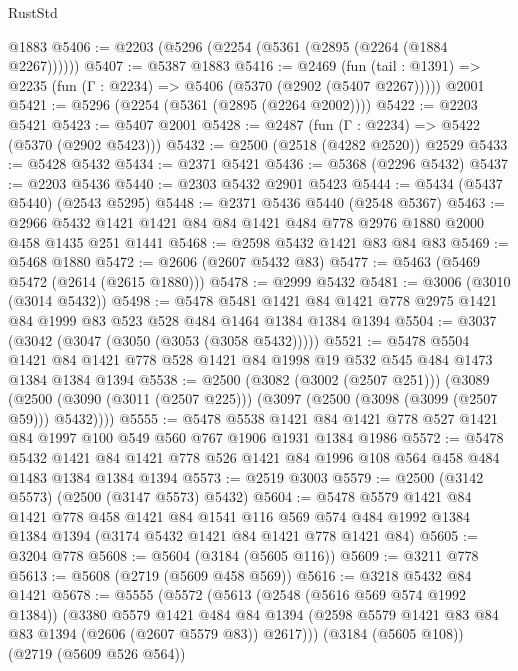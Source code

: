 \begin{lexlean}{RustStd}
\begin{coremodule}
    @1883
@5406 := @2203 (@5296 (@2254 (@5361 (@2895 (@2264 (@1884 @2267))))))
@5407 := @5387 @1883
@5416 := @2469
    (fun (tail : @1391) => @2235 (fun (Γ : @2234) => @5406 (@5370 (@2902 (@5407 @2267)))))
    @2001
@5421 := @5296 (@2254 (@5361 (@2895 (@2264 @2002))))
@5422 := @2203 @5421
@5423 := @5407 @2001
@5428 := @2487 (fun (Γ : @2234) => @5422 (@5370 (@2902 @5423)))
@5432 := @2500 (@2518 (@4282 @2520)) @2529
@5433 := @5428 @5432
@5434 := @2371 @5421
@5436 := @5368 (@2296 @5432)
@5437 := @2203 @5436
@5440 := @2303 @5432 @2901 @5423
@5444 := @5434 (@5437 @5440) (@2543 @5295)
@5448 := @2371 @5436 @5440 (@2548 @5367)
@5463 := @2966 @5432 @1421 @1421 @84 @84 @1421 @484 @778 @2976 @1880 @2000 @458 @1435 @251 @1441
@5468 := @2598 @5432 @1421 @83 @84 @83
@5469 := @5468 @1880
@5472 := @2606 (@2607 @5432 @83)
@5477 := @5463 (@5469 @5472 (@2614 (@2615 @1880)))
@5478 := @2999 @5432
@5481 := @3006 (@3010 (@3014 @5432))
@5498 := @5478
    @5481
    @1421
    @84
    @1421
    @778
    @2975
    @1421
    @84
    @1999
    @83
    @523
    @528
    @484
    @1464
    @1384
    @1384
    @1394
@5504 := @3037 (@3042 (@3047 (@3050 (@3053 (@3058 @5432)))))
@5521 := @5478
    @5504
    @1421
    @84
    @1421
    @778
    @528
    @1421
    @84
    @1998
    @19
    @532
    @545
    @484
    @1473
    @1384
    @1384
    @1394
@5538 := @2500
    (@3082 (@3002 (@2507 @251)))
    (@3089 (@2500 (@3090 (@3011 (@2507 @225))) (@3097 (@2500 (@3098 (@3099 (@2507 @59))) @5432))))
@5555 := @5478
    @5538
    @1421
    @84
    @1421
    @778
    @527
    @1421
    @84
    @1997
    @100
    @549
    @560
    @767
    @1906
    @1931
    @1384
    @1986
@5572 := @5478
    @5432
    @1421
    @84
    @1421
    @778
    @526
    @1421
    @84
    @1996
    @108
    @564
    @458
    @484
    @1483
    @1384
    @1384
    @1394
@5573 := @2519 @3003
@5579 := @2500 (@3142 @5573) (@2500 (@3147 @5573) @5432)
@5604 := @5478
    @5579
    @1421
    @84
    @1421
    @778
    @458
    @1421
    @84
    @1541
    @116
    @569
    @574
    @484
    @1992
    @1384
    @1384
    @1394
    (@3174 @5432 @1421 @84 @1421 @778 @1421 @84)
@5605 := @3204 @778
@5608 := @5604 (@3184 (@5605 @116))
@5609 := @3211 @778
@5613 := @5608 (@2719 (@5609 @458 @569))
@5616 := @3218 @5432 @84 @1421
@5678 := @5555
    (@5572
      (@5613
        (@2548 (@5616 @569 @574 @1992 @1384))
        (@3380
          @5579
          @1421
          @484
          @84
          @1394
          (@2598 @5579 @1421 @83 @84 @83 @1394 (@2606 (@2607 @5579 @83)) @2617)))
      (@3184 (@5605 @108))
      (@2719 (@5609 @526 @564))

\end{coremodule}
\end{lexlean}
